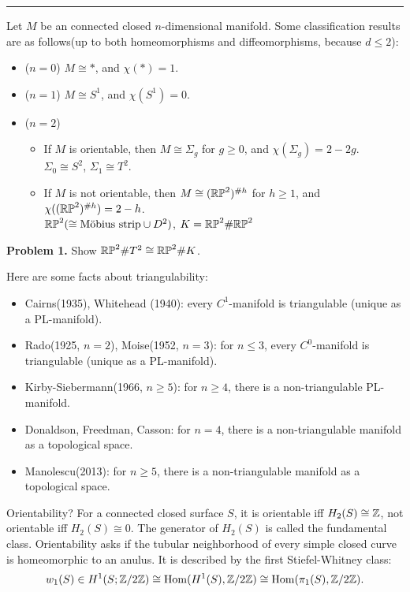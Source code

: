 \documentclass{../../../small}
\begin{document}
\smallskip\hrule\bigskip

Let $M$ be an connected closed $n$-dimensional manifold.
Some classification results are as follows(up to both homeomorphisms and diffeomorphisms, because $d\le2$):
\begin{itemize}
\item ($n=0$) $M\cong *$, and $\chi(*)=1$.
\item ($n=1$) $M\cong S^1$, and $\chi(S^1)=0$.
\item ($n=2$)
	\begin{itemize}
	\item If $M$ is orientable, then $M\cong\Sigma_g$ for $g\ge0$, and $\chi(\Sigma_g)=2-2g$.\\
	$\Sigma_0\cong S^2$, $\Sigma_1\cong T^2$.
	\item If $M$ is not orientable, then $M\cong(\mathbb{RP}^2)^{\# h}$ for $h\ge1$, and $\chi((\mathbb{RP}^2)^{\#h})=2-h$.\\
	$\mathbb{RP}^2(\cong\text{M\"obius strip}\cup D^2)$, $K=\mathbb{RP}^2\#\mathbb{RP}^2$
	\end{itemize}
\end{itemize}

\textbf{Problem 1.} Show $\mathbb{RP}^2\#T^2\cong\mathbb{RP}^2\#K$.
\bigskip

Here are some facts about triangulability:
\begin{itemize}
\item Cairns(1935), Whitehead (1940): every $C^1$-manifold is triangulable (unique as a PL-manifold).
\item Rado(1925, $n=2$), Moise(1952, $n=3$): for $n\le3$, every $C^0$-manifold is triangulable (unique as a PL-manifold).
\item Kirby-Siebermann(1966, $n\ge5$): for $n\ge4$, there is a non-triangulable PL-manifold.
\item Donaldson, Freedman, Casson: for $n=4$, there is a non-triangulable manifold as a topological space.
\item Manolescu(2013): for $n\ge5$, there is a non-triangulable manifold as a topological space.
\end{itemize}

Orientability?
For a connected closed surface $S$, it is orientable iff $H_2(S)\cong\mathbb{Z}$, not orientable iff $H_2(S)\cong0$. The generator of $H_2(S)$ is called the fundamental class.
Orientability asks if the tubular neighborhood of every simple closed curve is homeomorphic to an anulus.
It is described by the first Stiefel-Whitney class:
\[w_1(S)\in H^1(S;\mathbb{Z}/2\mathbb{Z})\cong\operatorname{Hom}(H^1(S),\mathbb{Z}/2\mathbb{Z})\cong\operatorname{Hom}(\pi_1(S),\mathbb{Z}/2\mathbb{Z}).\]
\end{document}
